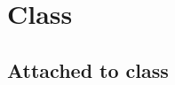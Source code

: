 \section{Class }\label{container-page-test-module-Labels-class-c}%
\subsection{Attached to class\label{L6}}%


